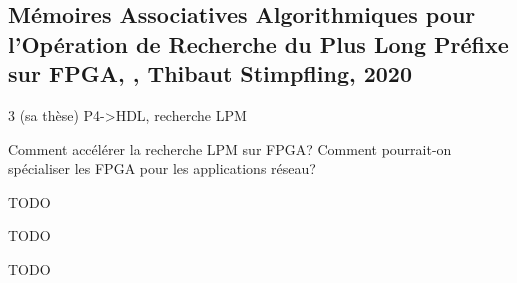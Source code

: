 
\subsection{Mémoires Associatives Algorithmiques pour l'Opération de Recherche du Plus Long Préfixe sur FPGA, \cite{stimpfling_memoires_2020}, Thibaut Stimpfling, 2020}
 3 (sa thèse)
 P4->HDL, recherche LPM

 Comment accélérer la recherche LPM sur FPGA? Comment pourrait-on spécialiser les FPGA pour les applications réseau?


 TODO

 TODO

 TODO

\clearpage
